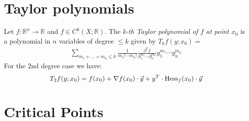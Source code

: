 \section{Taylor polynomials}

 Let $f\colon \mathbb{R}^n \to \mathbb{R}$ and $f\in C^k(X;\mathbb{R})$. The \textit{k-th Taylor polynomial of $f$ at point $x_0$} is a polynomial in $n$ variables of degree $\le k$ given by $T_kf(y;x_0) =$
\begin{align*}
\sum_{{m_1 + \ldots + m_n \leq k}}\frac{1}{m_1!\cdots m_n!}\frac{\partial^k f}{\partial_{1}^{m_1}\cdots \partial_{n}^{m_n}} y_1^{m_1}\cdots y_n^{m_n}
\end{align*}
For the 2nd degree case we have:
$$T_2f(y;x_0) = f(x_0) + \nabla f (x_0) \cdot \vec{y} + y^T \cdot \text{Hess}_f(x_0) \cdot \vec{y} $$

\section{Critical Points}
